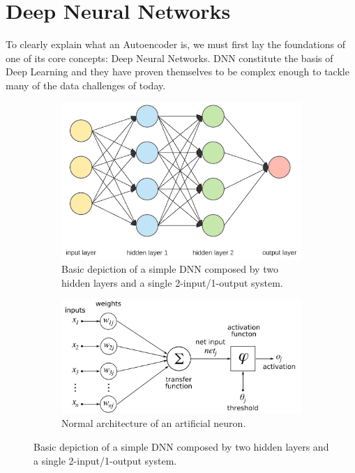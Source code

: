 \section{Deep Neural Networks}

To clearly explain what an Autoencoder is, we must first lay the foundations of one of its core concepts: Deep Neural Networks. DNN constitute the basis of Deep Learning and they have proven themselves to be complex enough to tackle many of the data challenges of today. \par

\begin{figure}[H]
	\begin{subfigure}{0.65\linewidth}  
		\centering
		\includegraphics[width=\linewidth]{Figuras_tfg/Figure2_tfg}
		\caption{Basic depiction of a simple DNN composed by two hidden layers and a single 2-input/1-output system.}
		\label{fig:fig2a} 
	\end{subfigure}
	
	\begin{subfigure}{0.65\linewidth} 
		\centering
		\includegraphics[width=\linewidth]{Figuras_tfg/ArtificialNeuronModel_english.png}
		\caption{Normal architecture of an artificial neuron.}
		\label{fig:fig2b} 
	\end{subfigure}
	\caption{Basic depiction of a simple DNN composed by two hidden layers and a single 2-input/1-output system.}
	\label{fig:fig2}
\end{figure}

